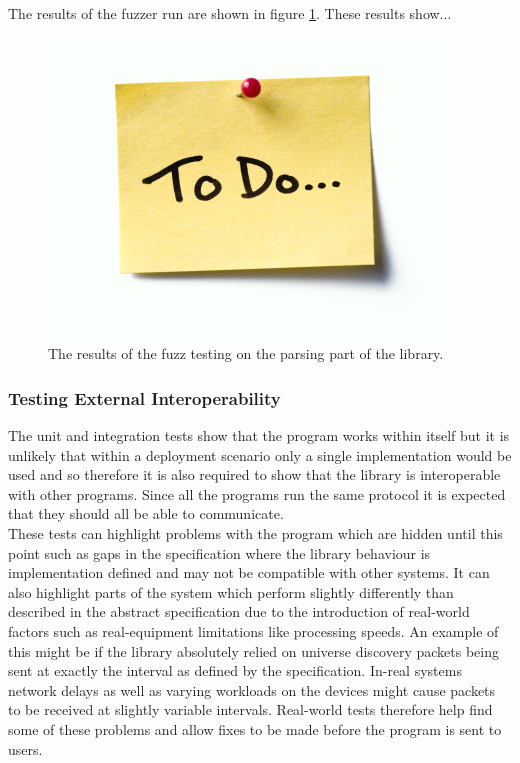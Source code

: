 \documentclass[11pt,a4paper]{article}
\begin{document}
The results of the fuzzer run are shown in figure \ref{FUZZ_RESULTS}. These results show...

\begin{figure}[H]
	\label{FUZZ_RESULTS}
	\includegraphics[width=\textwidth]{todo}
	\caption{The results of the fuzz testing on the parsing part of the library.}
\end{figure}

\subsubsection{Testing External Interoperability}
The unit and integration tests show that the program works within itself but it is unlikely that within a deployment scenario only a single implementation would be used and so therefore it is also required to show that the library is interoperable with other programs. Since all the programs run the same protocol it is expected that they should all be able to communicate. \\

These tests can highlight problems with the program which are hidden until this point such as gaps in the specification where the library behaviour is implementation defined and may not be compatible with other systems. It can also highlight parts of the system which perform slightly differently than described in the abstract specification due to the introduction of real-world factors such as real-equipment limitations like processing speeds. An example of this might be if the library absolutely relied on universe discovery packets being sent at exactly the interval as defined by the specification. In-real systems network delays as well as varying workloads on the devices might cause packets to be received at slightly variable intervals. Real-world tests therefore help find some of these problems and allow fixes to be made before the program is sent to users.
\end{document}
